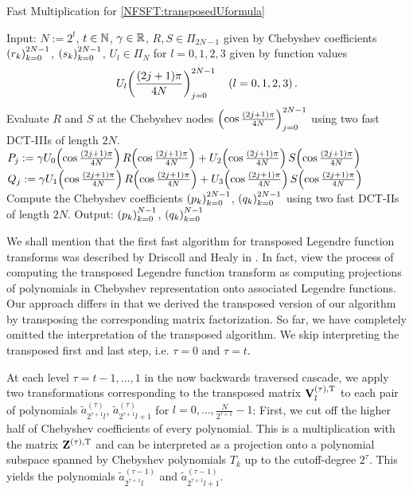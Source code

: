 \begin{algorithm}[tb]
  \caption{Fast Multiplication for \eqref{NFSFT:transposedUformula}}
  \label{NFSFT:Algorithm:Utransposed}
  \begin{algorithmic}
    \STATE Input:  $N := 2^t$, $t \in \mathbb{N}$, $\gamma \in \mathbb{R}$, $R,S \in \Pi_{2N-1}$ given by Chebyshev coefficients \\
    \STATE {} $\left(r_{k}\right)_{k=0}^{2N-1}$, $\left(s_{k}\right)_{k=0}^{2N-1}$, $U_{l} \in \Pi_{N}$ for $l=0,1,2,3$ 
      given by function values
      \[U_{l}{\hspace{-0.4ex}}\left(\frac{(2j+1)\pi}{4N}\right)_{j = 0}^{2N-1} \quad \left(l=0,1,2,3\right).\] 
    \STATE Evaluate $R$ and $S$ at the Chebyshev nodes $\left(\cos \frac{(2j+1)\pi}{4N}\right)_{j = 0}^{2N-1}$
      using two fast DCT-IIIs of length $2N$.
    \STATE 
      \STATE $P_{j} := \gamma U_{0}{\hspace{-0.4ex}}\left(\cos \frac{(2j+1)\pi}{4N}\right) R{\hspace{-0.4ex}}\left(\cos \frac{(2j+1)\pi}{4N}\right) +
                              U_{2}{\hspace{-0.4ex}}\left(\cos \frac{(2j+1)\pi}{4N}\right) S{\hspace{-0.4ex}}\left(\cos \frac{(2j+1)\pi}{4N}\right)$
      \STATE $Q_{j} := \gamma U_{1}{\hspace{-0.4ex}}\left(\cos \frac{(2j+1)\pi}{4N}\right) R{\hspace{-0.4ex}}\left(\cos \frac{(2j+1)\pi}{4N}\right) +
                              U_{3}{\hspace{-0.4ex}}\left(\cos \frac{(2j+1)\pi}{4N}\right) S{\hspace{-0.4ex}}\left(\cos \frac{(2j+1)\pi}{4N}\right)$
    \ENDFOR
    \STATE
    \STATE Compute the Chebyshev coefficients $\left(p_{k}\right)_{k=0}^{2N-1}$, $\left(q_{k}\right)_{k=0}^{2N-1}$ 
      using two fast DCT-IIs of length $2N$.
    \STATE
    \STATE Output: $\left(p_{k}\right)_{k=0}^{N-1}$, $\left(q_{k}\right)_{k=0}^{N-1}$
  \end{algorithmic}
\end{algorithm}  

We shall mention that the first fast algorithm for transposed Legendre 
function transforms was described by Driscoll and 
Healy in \cite{drhe}. In fact, view the process of 
computing the transposed Legendre function transform as computing projections of polynomials in Chebyshev representation onto 
associated Legendre functions. Our approach differs in that we derived the transposed version of our algorithm by transposing 
the corresponding matrix factorization. So far, we have completely omitted the interpretation of the transposed algorithm. 
We skip interpreting the transposed first and last step, i.e. $\tau = 0$ and $\tau = t$. 

At each level 
$\tau = t-1,\ldots,1$ in the now backwards traversed cascade, we apply
two transformations corresponding to the transposed matrix $\mathbf{V}^{(\tau),\text{\rm{T}}}_l$ to each pair of polynomials 
$\tilde{a}_{2^{\tau+1}l}^{(\tau)}$, $\tilde{a}_{2^{\tau+1}l+1}^{(\tau)}$ for $l=0,\ldots,\frac{N}{2^{\tau+1}}-1$:
First, we cut off the higher half of Chebyshev coefficients of every polynomial. This is a multiplication with the 
matrix ${\mathbf{Z}^{(\tau),\text{\rm{T}}}}$ and can be interpreted as a projection onto a polynomial subspace spanned by Chebyshev polynomials $T_{k}$
up to the cutoff-degree $2^{\tau}$. This yields the polynomials $\tilde{a}_{2^{\tau+1}l}^{(\tau-1)}$ and $\tilde{a}_{2^{\tau+1}l+1}^{(\tau-1)}$.

